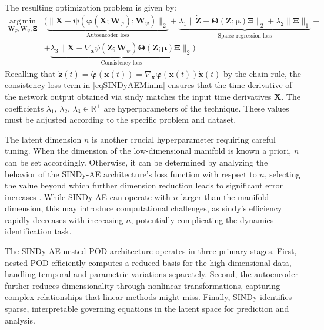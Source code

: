 \documentclass[reqno]{amsart}[standalone]
\theoremstyle{definition}
\theoremstyle{remark}
\newcommand{\R}{\mathbb{R}}
\newcommand{\bs}{\boldsymbol}
\DeclareMathOperator*{\argmin}{\arg\,\min}
\begin{document}
The resulting optimization problem is given by:
\begin{equation}\label{eqSINDyAEMinim}
\begin{split}
\underset{\bs{W}_\varphi, \bs{W}_\psi, \bs{\Xi}}{\argmin} &\Bigg(\underbrace{\|\bs{X} - \bs{\psi}(\bs{\varphi}(\bs{X};\bs{W}_\varphi);\bs{W}_\psi)\|_{2}^{}}_{\text{Autoencoder loss}}+ \underbrace{\lambda_1 \|\dot{\bs{Z}} - \bs{\Theta}(\bs{Z};\bs{\mu})\bs{\Xi}\|_{2}^{} +\lambda_2\|\bs{\Xi}\|_{1}}_{\text{Sparse regression loss}} + \\
&+ \underbrace{\lambda_3 \|\dot{\bs{X}} - \nabla_{\bs{z}}\psi(\bs{Z};\bs{W}_\psi) \bs{\Theta}(\bs{Z};\bs{\mu})\bs{\Xi}\|_{2}^{}}_{\text{Consistency loss}} \Bigg)
\end{split}
\end{equation}
Recalling that $\dot{\bs{z}}(t) = \dot{\bs{\varphi}}(\bs{x}(t)) = \nabla_{\bs{x}}\bs{\varphi}(\bs{x}(t))\dot{\bs{x}}(t)$ by the chain rule, the consistency loss term in \eqref{eqSINDyAEMinim} ensures that the time derivative of the network output obtained via \gls{sindy} matches the input time derivatives $\dot{\bs{X}}$. The coefficients $\lambda_1,\, \lambda_2,\, \lambda_3\in\R^+$ are hyperparameters of the technique.
%
These values must be adjusted according to the specific problem and dataset.

The latent dimension $n$ is another crucial hyperparameter requiring careful tuning. When the dimension of the low-dimensional manifold is known a priori, $n$ can be set accordingly. Otherwise, it can be determined by analyzing the behavior of the SINDy-AE architecture's loss function with respect to $n$, selecting the value beyond which further dimension reduction leads to significant error increases \parencite{Conti_2023}. While SINDy-AE can operate with $n$ larger than the manifold dimension, this may introduce computational challenges, as \gls{sindy}'s efficiency rapidly decreases with increasing $n$, potentially complicating the dynamics identification task.

The SINDy-AE-nested-POD architecture operates in three primary stages. First, nested POD efficiently computes a reduced basis for the high-dimensional data, handling temporal and parametric variations separately. Second, the autoencoder further reduces dimensionality through nonlinear transformations, capturing complex relationships that linear methods might miss. Finally, SINDy identifies sparse, interpretable governing equations in the latent space for prediction and analysis.
\end{document}
